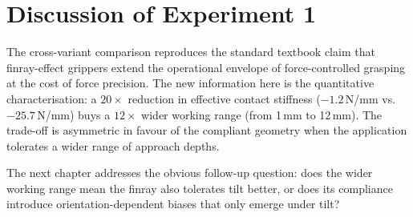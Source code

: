 \section{Discussion of Experiment 1}

The cross-variant comparison reproduces the standard textbook claim that
finray-effect grippers extend the operational envelope of force-controlled
grasping at the cost of force precision. The new information here is the
quantitative characterisation: a $20\times$ reduction in effective
contact stiffness ($-1.2$\,N/mm vs.~$-25.7$\,N/mm) buys a $12\times$ wider
working range (from 1\,mm to 12\,mm). The trade-off is asymmetric in
favour of the compliant geometry when the application tolerates a wider
range of approach depths.

The next chapter addresses the obvious follow-up question: does the wider
working range mean the finray also tolerates tilt better, or does its
compliance introduce orientation-dependent biases that only emerge under
tilt?
